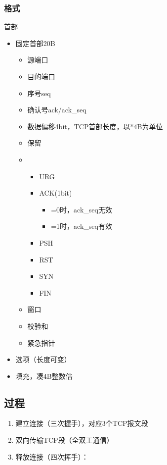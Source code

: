 \subsubsection{格式}
首部\begin{itemize}
    \item 固定首部20B\begin{itemize}
        \item 源端口
        \item 目的端口
        \item 序号seq
        \item 确认号ack/ack\_seq
        \item 数据偏移4bit，TCP首部长度，以*4B为单位
        \item 保留
        \item \begin{itemize}
            \item URG
            \item ACK(1bit)\begin{itemize}
                \item =0时，ack\_seq无效
                \item =1时，ack\_seq有效
            \end{itemize}
            \item PSH
            \item RST
            \item SYN
            \item FIN
        \end{itemize}
        \item 窗口
        \item 校验和
        \item 紧急指针
    \end{itemize}
    \item 选项（长度可变）
    \item 填充，凑4B整数倍
\end{itemize}


\subsection{过程}
\begin{enumerate}
    \item 建立连接（三次握手），对应3个TCP报文段
    \item 双向传输TCP段（全双工通信）
    \item 释放连接（四次挥手）：
\end{enumerate}

